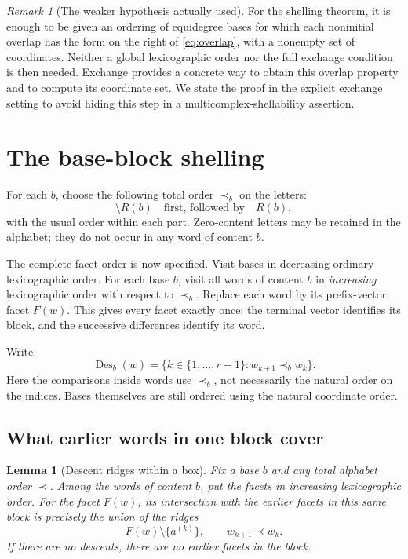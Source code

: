 \documentclass[11pt]{article}
\numberwithin{equation}{section}
\newtheorem{lemma}[theorem]{Lemma}
\theoremstyle{definition}
\theoremstyle{remark}
\newtheorem{remark}[theorem]{Remark}
\begin{document}
\begin{remark}[The weaker hypothesis actually used]
\label{rem:weaker}
For the shelling theorem, it is enough to be given an ordering of equidegree
bases for which each noninitial overlap has the form on the right of
\eqref{eq:overlap}, with a nonempty set of coordinates. Neither a global
lexicographic order nor the full exchange condition is then needed. Exchange
provides a concrete way to obtain this overlap property and to compute its
coordinate set. We state the proof in the explicit exchange setting to avoid
hiding this step in a multicomplex-shellability assertion.
\end{remark}

\section{The base-block shelling}
\label{sec:shelling}

For each $b$, choose the following total order $\prec_b$ on the letters:
\begin{equation}
 [s]\setminus R(b)\quad\text{first, followed by}\quad R(b),
 \label{eq:alphabet}
\end{equation}
with the usual order within each part. Zero-content letters may be retained
in the alphabet; they do not occur in any word of content $b$.

The complete facet order is now specified. Visit bases in decreasing ordinary
lexicographic order. For each base $b$, visit all words of content $b$ in
\emph{increasing} lexicographic order with respect to $\prec_b$. Replace each
word by its prefix-vector facet $F(w)$. This gives every facet exactly once:
the terminal vector identifies its block, and the successive differences
identify its word.

Write
\begin{equation}
 \operatorname{Des}_b(w)=
 \{k\in\{1,\ldots,r-1\}:w_{k+1}\prec_b w_k\}.
 \label{eq:descent}
\end{equation}
Here the comparisons inside words use $\prec_b$, not necessarily the natural
order on the indices. Bases themselves are still ordered using the natural
coordinate order.

\subsection{What earlier words in one block cover}

\begin{lemma}[Descent ridges within a box]
\label{lem:word}
Fix a base $b$ and any total alphabet order $\prec$. Among the words of
content $b$, put the facets in increasing lexicographic order. For the facet
$F(w)$, its intersection with the earlier facets in this same block is
precisely the union of the ridges
\begin{equation}
 F(w)\setminus\{a^{(k)}\},\qquad
             w_{k+1}\prec w_k.
 \label{eq:word-ridges}
\end{equation}
If there are no descents, there are no earlier facets in the block.
\end{lemma}
\end{document}
